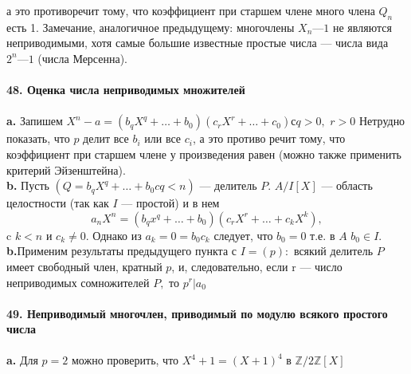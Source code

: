\pagebreak
\noindent а это противоречит тому, что коэффициент при старшем члене много­\linebreak
члена $Q_n$ есть 1. Замечание, аналогичное предыдущему: многочлены\linebreak
$X_n — 1$ не являются неприводимыми, хотя самые большие известные\linebreak
простые числа — числа вида $2^{n} — 1$ (числа Мерсенна).\\
\\
\noindent\textbf{48. Оценка числа неприводимых множителей}\\
\\
\hspace*{15pt}\textbf{a.} Запишем $X^{n} - a = (b_{q}X^{q}+\ldots+ b_0)(c_{r}X^r+\ldots+c_0) с q > 0,$\linebreak
$r > 0$ Нетрудно показать, что $p$ делит все $b_i$ или все $c_i$, а это противо­\linebreak
речит тому, что коэффициент при старшем члене у произведения равен (можно также применить критерий Эйзенштейна).\\
\hspace*{15pt}\textbf{b.} Пусть $(Q = b_{q}X^{q}+\ldots+b_0 c q< n)$ --- делитель $P$. $A/I[X]$ ---\linebreak
область целостности (так как $I$ --- простой) и в нем
$$a_{n}X^{n} = (b_{q}x^{q}+\ldots+b_0)(c_{r}X^{r}+\ldots+c_{k}X^{k}),$$
c $k < n$ и $c_k \neq 0.$ Однако из $a_k = 0 = b_{0}c_k$ следует, что $b_0 = 0 $ т.е. в $A$\linebreak
$b_0 \in I.$\\
\hspace*{15pt}\textbf{b.}Применим результаты предыдущего пункта с $I = (p):$ всякий\linebreak
делитель $P$ имеет свободный член, кратный $p$, и, следовательно, если\linebreak 
r --- число неприводимых сомножителей $P,$ то $p^r | a_0$\\
\\
\indent\textbf{49. Неприводимый многочлен, приводимый по модулю
всякого простого числа}\\
\\
\hspace*{15pt}\textbf{a.} Для $p = 2$ можно проверить, что $X^{4} + 1 = (X + 1)^{4}$ в $\mathbb{Z}/2\mathbb{Z}[X]$\\
